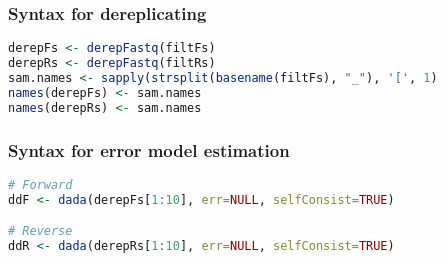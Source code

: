 \subsubsection*{Syntax for dereplicating}

\begin{lstlisting}[language=R]
derepFs <- derepFastq(filtFs)
derepRs <- derepFastq(filtRs)
sam.names <- sapply(strsplit(basename(filtFs), "_"), '[', 1)
names(derepFs) <- sam.names
names(derepRs) <- sam.names
\end{lstlisting}

\subsubsection*{Syntax for error model estimation}

\begin{lstlisting}[language=R]
# Forward
ddF <- dada(derepFs[1:10], err=NULL, selfConsist=TRUE)

# Reverse
ddR <- dada(derepRs[1:10], err=NULL, selfConsist=TRUE)
\end{lstlisting}